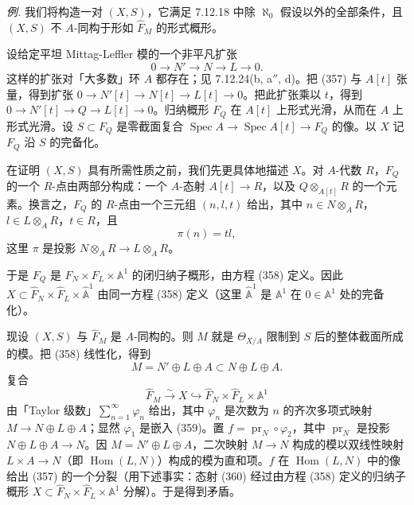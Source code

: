  \emph{例.} 我们将构造一对 $(X,S)$，它满足 7.12.18 中除 $\aleph_0$ 假设以外的全部条件，且 $(X,S)$ 不 $A$-同构于形如 $\widehat F_M$ 的形式概形。

设给定平坦 Mittag-Leffler 模的一个非平凡扩张
\begin{equation}\tag{357}
0\to N'\to N\to L\to 0.
\end{equation}
这样的扩张对「大多数」环 $A$ 都存在；见 7.12.24(b, a$''$, d)。把 (357) 与 $A[t]$ 张量，得到扩张 $0\to N'[t]\to N[t]\to L[t]\to 0$。把此扩张乘以 $t$，得到 $0\to N'[t]\to Q\to L[t]\to 0$。归纳概形 $F_Q$ 在 $A[t]$ 上形式光滑，从而在 $A$ 上形式光滑。设 $S\subset F_Q$ 是零截面复合 $\operatorname{Spec}A\to\operatorname{Spec}A[t]\to F_Q$ 的像。以 $X$ 记 $F_Q$ 沿 $S$ 的完备化。

在证明 $(X,S)$ 具有所需性质之前，我们先更具体地描述 $X$。对 $A$-代数 $R$，$F_Q$ 的一个 $R$-点由两部分构成：一个 $A$-态射 $A[t]\to R$，以及 $Q\otimes_{A[t]}R$ 的一个元素。换言之，$F_Q$ 的 $R$-点由一个三元组 $(n,l,t)$ 给出，其中 $n\in N\otimes_A R$，$l\in L\otimes_A R$，$t\in R$，且
\begin{equation}\tag{358}
\pi(n)=tl,
\end{equation}
这里 $\pi$ 是投影 $N\otimes_A R\to L\otimes_A R$。


于是 $F_Q$ 是 $F_N\times F_L\times\mathbb{A}^1$ 的闭归纳子概形，由方程 (358) 定义。因此 $X\subset\widehat F_N\times\widehat F_L\times\widehat{\mathbb{A}}^1$ 由同一方程 (358) 定义（这里 $\widehat{\mathbb{A}}^1$ 是 $\mathbb{A}^1$ 在 $0\in\mathbb{A}^1$ 处的完备化）。

现设 $(X,S)$ 与 $\widehat F_M$ 是 $A$-同构的。则 $M$ 就是 $\Theta_{X/A}$ 限制到 $S$ 后的整体截面所成的模。把 (358) 线性化，得到
\begin{equation}\tag{359}
M=N'\oplus L\oplus A\subset N\oplus L\oplus A.
\end{equation}
复合
\begin{equation}\tag{360}
\widehat F_M\xrightarrow{\sim}X\hookrightarrow\widehat F_N\times\widehat F_L\times\mathbb{A}^1
\end{equation}
由「Taylor 级数」$\sum_{n=1}^{\infty}\varphi_n$ 给出，其中 $\varphi_n$ 是次数为 $n$ 的齐次多项式映射 $M\to N\oplus L\oplus A$；显然 $\varphi_1$ 是嵌入 (359)。置 $f=\operatorname{pr}_N\circ\varphi_2$，其中 $\operatorname{pr}_N$ 是投影 $N\oplus L\oplus A\to N$。因 $M=N'\oplus L\oplus A$，二次映射 $M\to N$ 构成的模以双线性映射 $L\times A\to N$（即 $\operatorname{Hom}(L,N)$）构成的模为直和项。$f$ 在 $\operatorname{Hom}(L,N)$ 中的像给出 (357) 的一个分裂（用下述事实：态射 (360) 经过由方程 (358) 定义的归纳子概形 $X\subset\widehat F_N\times\widehat F_L\times\mathbb{A}^1$ 分解）。于是得到矛盾。

